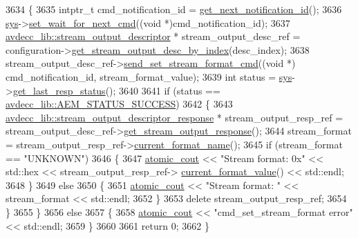 \begin{DoxyCode}
3634     \{
3635         intptr\_t cmd\_notification\_id = \hyperlink{classcmd__line_a57486218387d1aa9d262eb7c176154ad}{get\_next\_notification\_id}();
3636         \hyperlink{classcmd__line_a485db4800e331cb4052c447fdf5d154e}{sys}->\hyperlink{classavdecc__lib_1_1system_a26b769584f10225077da47583edda33e}{set\_wait\_for\_next\_cmd}((\textcolor{keywordtype}{void} *)cmd\_notification\_id);
3637         \hyperlink{classavdecc__lib_1_1stream__output__descriptor}{avdecc\_lib::stream\_output\_descriptor} * stream\_output\_desc\_ref =
       configuration->\hyperlink{classavdecc__lib_1_1configuration__descriptor_a300ea5957342e2e9579318135da02856}{get\_stream\_output\_desc\_by\_index}(desc\_index);
3638         stream\_output\_desc\_ref->\hyperlink{classavdecc__lib_1_1stream__output__descriptor_a7407f2ca9a5a63a404e5f96ccdbf31f3}{send\_set\_stream\_format\_cmd}((\textcolor{keywordtype}{void} *)
      cmd\_notification\_id, stream\_format\_value);
3639         \textcolor{keywordtype}{int} status = \hyperlink{classcmd__line_a485db4800e331cb4052c447fdf5d154e}{sys}->\hyperlink{classavdecc__lib_1_1system_aa63e8d1a4e51f695cdcccc9340922407}{get\_last\_resp\_status}();
3640 
3641         \textcolor{keywordflow}{if} (status == \hyperlink{namespaceavdecc__lib_affd436edb2cecd20cfd784a84f852b2bac947077909cb590b84f4b5db413080e0}{avdecc\_lib::AEM\_STATUS\_SUCCESS})
3642         \{
3643             \hyperlink{classavdecc__lib_1_1stream__output__descriptor__response}{avdecc\_lib::stream\_output\_descriptor\_response} * 
      stream\_output\_resp\_ref = stream\_output\_desc\_ref->\hyperlink{classavdecc__lib_1_1stream__output__descriptor_af92b70610c451a7f1eefcb71b3d97eb8}{get\_stream\_output\_response}();
3644             stream\_format = stream\_output\_resp\_ref->\hyperlink{classavdecc__lib_1_1stream__output__descriptor__response_a24176b56bc0f1873b27d00565bc397c5}{current\_format\_name}();
3645             \textcolor{keywordflow}{if} (stream\_format == \textcolor{stringliteral}{"UNKNOWN"})
3646             \{
3647                 \hyperlink{cmd__line_8h_a0bc38ccc65c79ba06c6fcd7b4bf554c3}{atomic\_cout} << \textcolor{stringliteral}{"Stream format: 0x"} << std::hex << stream\_output\_resp\_ref->
      \hyperlink{classavdecc__lib_1_1stream__output__descriptor__response_a6fded21e06a52c7031a0ce0b6f306ca0}{current\_format\_value}() << std::endl;
3648             \}
3649             \textcolor{keywordflow}{else}
3650             \{
3651                 \hyperlink{cmd__line_8h_a0bc38ccc65c79ba06c6fcd7b4bf554c3}{atomic\_cout} << \textcolor{stringliteral}{"Stream format: "} << stream\_format << std::endl;
3652             \}
3653             \textcolor{keyword}{delete} stream\_output\_resp\_ref;
3654         \}
3655     \}
3656     \textcolor{keywordflow}{else}
3657     \{
3658         \hyperlink{cmd__line_8h_a0bc38ccc65c79ba06c6fcd7b4bf554c3}{atomic\_cout} << \textcolor{stringliteral}{"cmd\_set\_stream\_format error"} << std::endl;
3659     \}
3660 
3661     \textcolor{keywordflow}{return} 0;
3662 \}
\end{DoxyCode}


